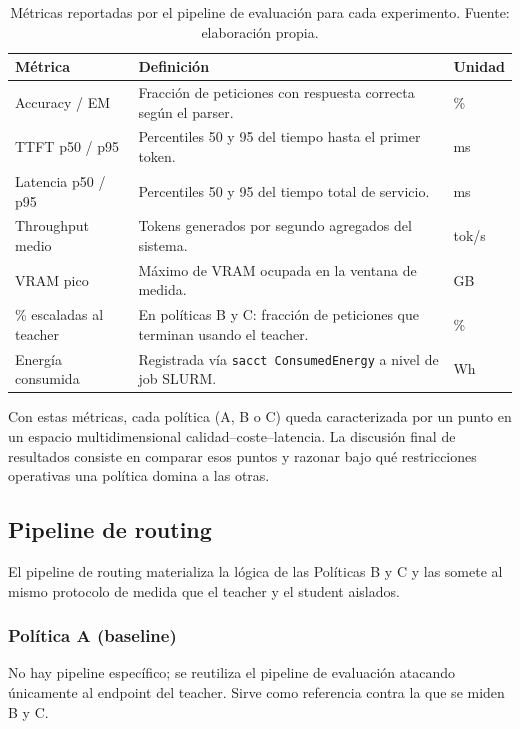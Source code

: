 \begin{table}[H]
\centering
\caption{Métricas reportadas por el pipeline de evaluación para cada experimento. Fuente: elaboración propia.}
\label{tab:metricas-reportadas}
\footnotesize
\begin{tabularx}{\textwidth}{>{\raggedright\arraybackslash}p{3.5cm} >{\raggedright\arraybackslash}X >{\raggedright\arraybackslash}p{3.2cm}}
\toprule
\textbf{Métrica} & \textbf{Definición} & \textbf{Unidad} \\
\midrule
Accuracy / EM & Fracción de peticiones con respuesta correcta según el parser. & \% \\
TTFT p50 / p95 & Percentiles 50 y 95 del tiempo hasta el primer token. & ms \\
Latencia p50 / p95 & Percentiles 50 y 95 del tiempo total de servicio. & ms \\
Throughput medio & Tokens generados por segundo agregados del sistema. & tok/s \\
VRAM pico & Máximo de VRAM ocupada en la ventana de medida. & GB \\
\% escaladas al teacher & En políticas B y C: fracción de peticiones que terminan usando el teacher. & \% \\
Energía consumida & Registrada vía \texttt{sacct ConsumedEnergy} a nivel de job SLURM. & Wh \\
\bottomrule
\end{tabularx}
\end{table}

Con estas métricas, cada política (A, B o C) queda caracterizada por un punto en un espacio multidimensional calidad--coste--latencia. La discusión final de resultados consiste en comparar esos puntos y razonar bajo qué restricciones operativas una política domina a las otras.

\subsection{Pipeline de routing}

El pipeline de routing materializa la lógica de las Políticas B y C y las somete al mismo protocolo de medida que el teacher y el student aislados.

\subsubsection{Política A (baseline)}

No hay pipeline específico; se reutiliza el pipeline de evaluación atacando únicamente al endpoint del teacher. Sirve como referencia contra la que se miden B y C.

